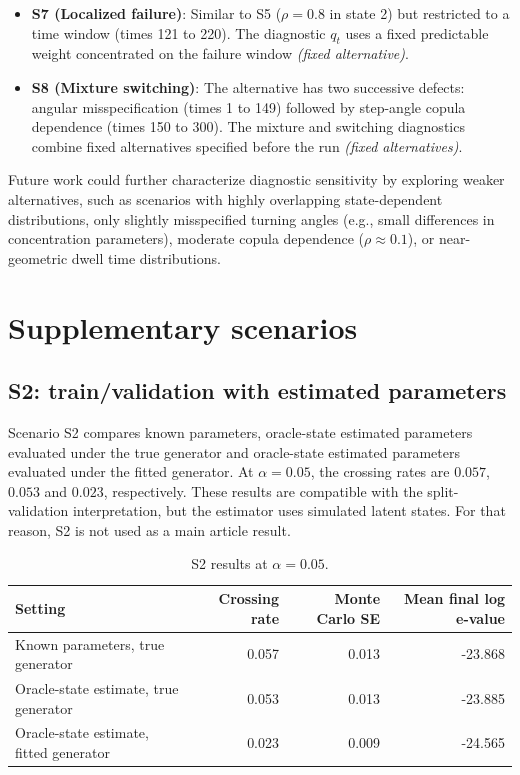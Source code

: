 \documentclass[pdflatex,sn-basic]{sn-jnl}
\newcommand{\1}{\mathbf 1}
\begin{document}
\begin{itemize}
    \item \textbf{S7 (Localized failure)}: Similar to S5 ($\rho = 0.8$ in state 2) but restricted to a time window (times 121 to 220). The diagnostic $q_t$ uses a fixed predictable weight concentrated on the failure window \emph{(fixed alternative)}.
    \item \textbf{S8 (Mixture switching)}: The alternative has two successive defects: angular misspecification (times 1 to 149) followed by step-angle copula dependence (times 150 to 300). The mixture and switching diagnostics combine fixed alternatives specified before the run \emph{(fixed alternatives)}.
\end{itemize}
Future work could further characterize diagnostic sensitivity by exploring weaker alternatives, such as scenarios with highly overlapping state-dependent distributions, only slightly misspecified turning angles (e.g., small differences in concentration parameters), moderate copula dependence ($\rho \approx 0.1$), or near-geometric dwell time distributions.

\section{Supplementary scenarios}

\subsection{S2: train/validation with estimated parameters}

Scenario S2 compares known parameters, oracle-state estimated parameters evaluated under the true generator and oracle-state estimated parameters evaluated under the fitted generator. At $\alpha=0.05$, the crossing rates are $0.057$, $0.053$ and $0.023$, respectively. These results are compatible with the split-validation interpretation, but the estimator uses simulated latent states. For that reason, S2 is not used as a main article result.

\begin{table}[h]
\centering
\footnotesize
\begin{tabular}{@{}lrrr@{}}
\toprule
Setting & Crossing rate & Monte Carlo SE & Mean final log e-value \\
\midrule
Known parameters, true generator & 0.057 & 0.013 & -23.868 \\
Oracle-state estimate, true generator & 0.053 & 0.013 & -23.885 \\
Oracle-state estimate, fitted generator & 0.023 & 0.009 & -24.565 \\
\bottomrule
\end{tabular}
\caption{S2 results at $\alpha=0.05$.}
\label{tab:supp_s2}
\end{table}
\end{document}
